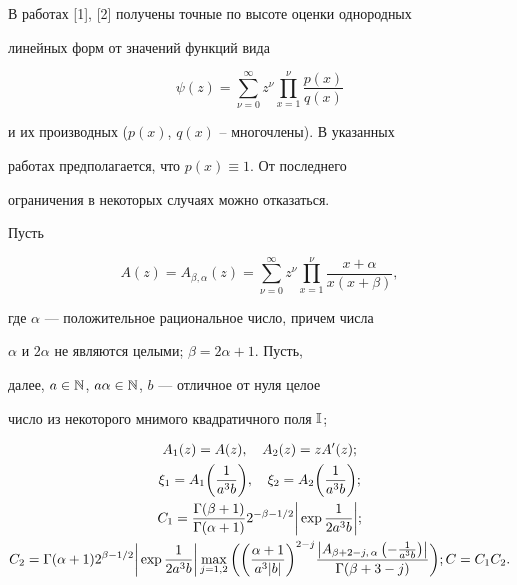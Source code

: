 \label{begin} 


 


 


В работах [1], [2] получены точные по высоте оценки однородных 


линейных форм от значений функций вида 


$$ 


\psi(z)=\sum^\infty_{\nu=0}z^\nu\prod^\nu_{x=1} 


\frac{p(x)}{q(x)} 


$$ 


и их производных ($p(x)$, $q(x)$ -- многочлены). В указанных 


работах предполагается, что $p(x)\equiv1$. От последнего 


ограничения в некоторых случаях можно отказаться. 


 


Пусть 


$$ 


A(z)=A_{\beta,\alpha}(z)=\sum^\infty_{\nu=0}z^\nu 


\prod^\nu_{x=1}\frac{x+\alpha}{x(x+\beta)}, 


$$ 


где $\alpha$ --- положительное рациональное число, причем числа 


$\alpha$ и $2\alpha$ не являются целыми; $\beta=2\alpha+1$. Пусть, 


далее, $a\in\Bbb N$, $a\alpha\in\Bbb N$, $b$ --- отличное от нуля целое 


число из некоторого мнимого квадратичного поля $\Bbb I$; 


\begin{gather} 


A_1(z)=A(z),\quad A_2(z)=z A'(z);\notag \\ 


\xi_1=A_1\bigg(\frac{1}{a^3b}\bigg),\quad 


\xi_2=A_2\bigg(\frac{1}{a^3b}\bigg);\notag \\ 


C_1=\frac{\Gamma(\beta+1)}{\Gamma(\alpha+1)} 


2^{-\beta-1/2}\bigg|\exp\frac{1}{2a^3b} \bigg|;\\ 


C_2=\Gamma(\alpha+1)2^{\beta-1/2} 


\bigg|\exp\frac{1}{2a^3b} \bigg| 


\max_{j=1,2}\bigg(\bigg(\frac{\alpha+1}{a^3|b|} 


\bigg)^{2-j} 


\frac{\left|A_{\beta+2-j,\,\alpha}\left( 


-\frac{1}{a^3b}\right)\right|}{\Gamma(\beta+3-j)} 


\bigg);\notag 


C=C_1C_2.\notag 


\end{gather} 


